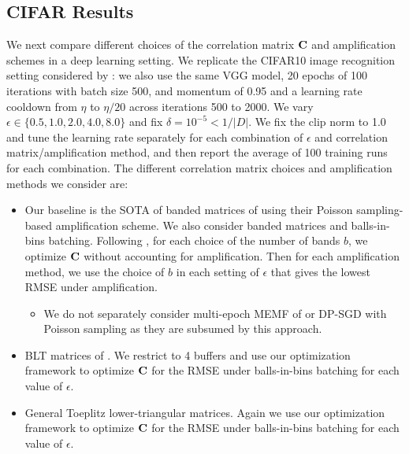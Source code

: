 \subsection{CIFAR Results}\label{sec:cifar}

We next compare different choices of the correlation matrix $\mathbf{C}$ and amplification schemes in a deep learning setting. We replicate the CIFAR10 image recognition setting considered by  \citep{choquette2024amplified}: we also use the same VGG model, 20 epochs of 100 iterations with batch size 500, and momentum of 0.95 and a learning rate cooldown from $\eta$ to $\eta/20$ across iterations 500 to 2000. We vary $\epsilon \in \{0.5, 1.0, 2.0, 4.0, 8.0\}$ and fix $\delta = 10^{-5} < 1/|D|$. We fix the clip norm to 1.0 and tune the learning rate separately for each combination of $\epsilon$ and correlation matrix/amplification method, and then report the average of 100 training runs for each combination. The different correlation matrix choices and amplification methods we consider are:

\begin{itemize}
    \item Our baseline is the SOTA of banded matrices of \citet{choquette2024amplified} using their Poisson sampling-based amplification scheme. We also consider banded matrices and balls-in-bins batching. Following \citet{choquette2024amplified}, for each choice of the number of bands $b$, we optimize $\mathbf{C}$ without accounting for amplification. Then for each amplification method, we use the choice of $b$ in each setting of $\epsilon$ that gives the lowest RMSE under amplification.
    \begin{itemize}
        \item We do not separately consider multi-epoch MEMF of \citet{choquette2022multi} or DP-SGD with Poisson sampling as they are subsumed by this approach.
    \end{itemize}
    \item BLT matrices of \citet{dvijotham2024efficientnearoptimalnoisegeneration}. We restrict to 4 buffers and use our optimization framework to optimize $\mathbf{C}$ for the RMSE under balls-in-bins batching for each value of $\epsilon$.
    \item General Toeplitz lower-triangular matrices. Again we use our optimization framework to optimize $\mathbf{C}$ for the RMSE under balls-in-bins batching for each value of $\epsilon$.
\end{itemize}



